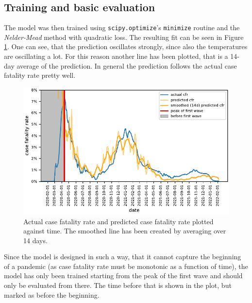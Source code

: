 \documentclass{article}
\begin{document}
\subsection{Training and basic evaluation}

The model was then trained using \texttt{scipy.optimize}'s \texttt{minimize} routine and the \textit{Nelder-Mead} method with quadratic loss. The resulting fit can be seen in Figure \ref{fig:prediction}. One can see, that the prediction oscillates strongly, since also the temperatures are oscillating a lot. For this reason another line has been plotted, that is a 14-day average of the prediction. In general the prediction follows the actual case fatality rate pretty well.

\begin{figure}[hbt!]
  \begin{center}
    \includegraphics{../fig/prediction.pdf}
    \caption{Actual case fatality rate and predicted case fatality rate plotted against time. The smoothed line has been created by averaging over 14 days.}
    \label{fig:prediction}
  \end{center}
\end{figure} 

Since the model is designed in such a way, that it cannot capture the beginning of a pandemic (as case fatality rate must be monotonic as a function of time), the model has only been trained starting from the peak of the first wave and should only be evaluated from there. The time before that is shown in the plot, but marked as before the beginning. 

\end{document}
